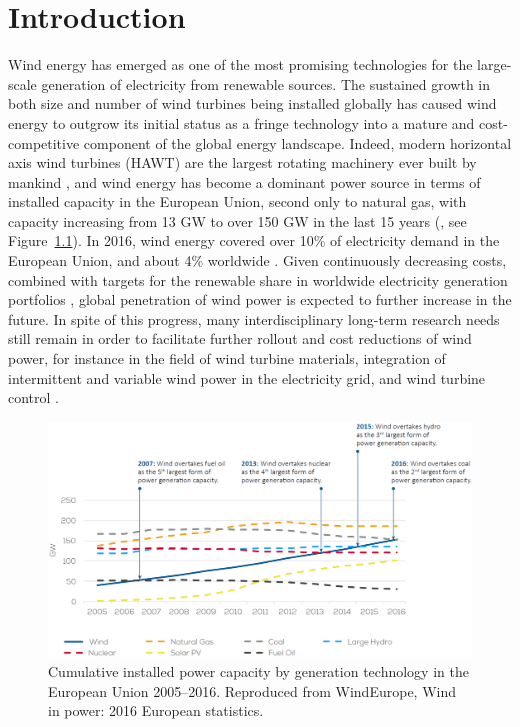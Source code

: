 \chapter{Introduction}\label{ch:introduction}

Wind energy has emerged as one of the most promising technologies for the large-scale generation of electricity from renewable sources. The sustained growth in both size and number of wind turbines being installed globally has caused wind energy to outgrow its initial status as a fringe technology into a mature and cost-competitive component of the global energy landscape. Indeed, modern horizontal axis wind turbines (HAWT) are the largest rotating machinery ever built by mankind \citep{van2016long}, and wind energy has become a dominant power source in terms of installed capacity in the European Union, second only to natural gas, with capacity increasing from 13 GW to over 150 GW in the last 15 years (\citealp{windeurope}, see Figure~\ref{fig:windeurope}). In 2016, wind energy covered over 10\% of electricity demand in the European Union, and about 4\% worldwide \citep{gwec2017}. Given continuously decreasing costs, combined with targets for the renewable share in worldwide electricity generation portfolios \citep{EC,ren21}, global penetration of wind power is expected to further increase in the future. In spite of this progress, many interdisciplinary long-term research needs still remain in order to facilitate further rollout and cost reductions of wind power, for instance in the field of wind turbine materials, integration of intermittent and variable wind power in the electricity grid, and wind turbine control \citep{wind2013long,van2016long}.

\begin{figure}
	\centering
	\includegraphics[width=\textwidth]{chapters/introduction/we3.eps}
	\caption{Cumulative installed power capacity by generation technology in the European Union 2005--2016. Reproduced from WindEurope, Wind in power: 2016 European statistics.  \label{fig:windeurope}}
\end{figure}

